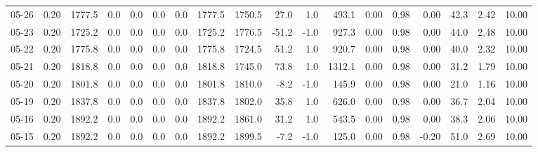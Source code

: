 \begin{threeparttable}
{\begin{tabular}{lrrrrrrrrrrrrrrrrr}
  05-26 &     0.20 & 1777.5 &               0.0 &               0.0 &                0.0 &                0.0 & 1777.5 & 1750.5 &       27.0 &                      1.0 &               493.1 &       0.00 &      0.98 &           0.00 &             42.3 &            2.42 &                  10.00 \\
  05-23 &     0.20 & 1725.2 &               0.0 &               0.0 &                0.0 &                0.0 & 1725.2 & 1776.5 &      -51.2 &                     -1.0 &               927.3 &       0.00 &      0.98 &           0.00 &             44.0 &            2.48 &                  10.00 \\
  05-22 &     0.20 & 1775.8 &               0.0 &               0.0 &                0.0 &                0.0 & 1775.8 & 1724.5 &       51.2 &                      1.0 &               920.7 &       0.00 &      0.98 &           0.00 &             40.0 &            2.32 &                  10.00 \\
  05-21 &     0.20 & 1818.8 &               0.0 &               0.0 &                0.0 &                0.0 & 1818.8 & 1745.0 &       73.8 &                      1.0 &              1312.1 &       0.00 &      0.98 &           0.00 &             31.2 &            1.79 &                  10.00 \\
  05-20 &     0.20 & 1801.8 &               0.0 &               0.0 &                0.0 &                0.0 & 1801.8 & 1810.0 &       -8.2 &                     -1.0 &               145.9 &       0.00 &      0.98 &           0.00 &             21.0 &            1.16 &                  10.00 \\
  05-19 &     0.20 & 1837.8 &               0.0 &               0.0 &                0.0 &                0.0 & 1837.8 & 1802.0 &       35.8 &                      1.0 &               626.0 &       0.00 &      0.98 &           0.00 &             36.7 &            2.04 &                  10.00 \\
  05-16 &     0.20 & 1892.2 &               0.0 &               0.0 &                0.0 &                0.0 & 1892.2 & 1861.0 &       31.2 &                      1.0 &               543.5 &       0.00 &      0.98 &           0.00 &             38.3 &            2.06 &                  10.00 \\
  05-15 &     0.20 & 1892.2 &               0.0 &               0.0 &                0.0 &                0.0 & 1892.2 & 1899.5 &       -7.2 &                     -1.0 &               125.0 &       0.00 &      0.98 &          -0.20 &             51.0 &            2.69 &                  10.00 \\

\end{tabular}}
\end{threeparttable}
